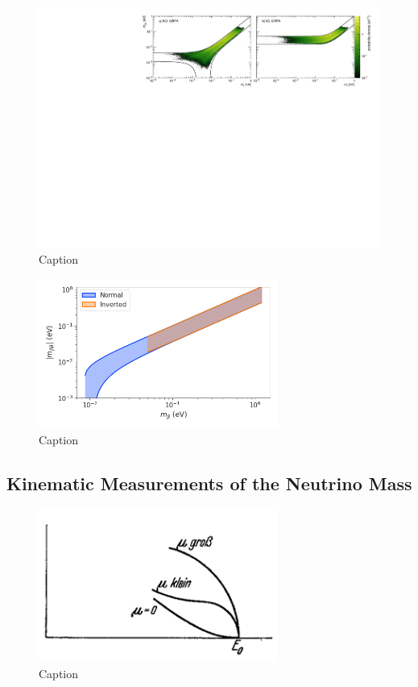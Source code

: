 \begin{figure}[htbp]
    \centering
    \includegraphics[width=1.0\textwidth]{figs/Chapter-2/230228_nu_mass_0nbb.pdf}
    \caption{Caption}
    \label{fig:nu_mass_0nbb_posterior}
\end{figure}

\begin{figure}[htbp]
    \centering
    \includegraphics[width=0.7\textwidth]{figs/Chapter-2/230301_mbb_vs_mb.png}
    \caption{Caption}
    \label{fig:nu_mass_0nbb_vs_nu_beta}
\end{figure}

\subsection{Kinematic Measurements of the Neutrino Mass}

\begin{figure}[htbp]
    \centering
    \includegraphics[width=0.7\textwidth]{figs/Chapter-2/Fermi.png}
    \caption{Caption}
    \label{fig:fermi_original_b_spectrum}
\end{figure}

